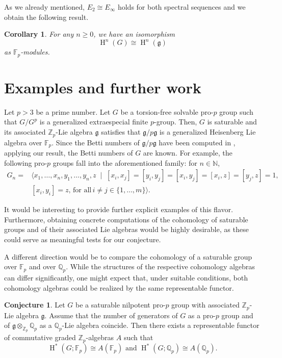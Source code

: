 \documentclass[11pt]{article}
\newcommand{\N}{\mathbb{N}}
\newcommand{\Z}{\mathbb{Z}}
\newcommand{\Q}{\mathbb{Q}}
\newcommand{\F}{\mathbb{F}}
\newcommand{\Fp}{\mathbb{F}_p}
\newcommand{\Zp}{\mathbb{Z}_p}
\newcommand{\Qp}{\mathbb{Q}_p}
\newcommand{\g}{\mathfrak{g}}
\DeclareMathOperator{\HH}{H}
\newcommand{\isom}{\cong}
\theoremstyle{plain}
\newtheorem{corollary}[lemma]{Corollary}
\theoremstyle{definition}
\newtheorem*{Conjecture}{Conjecture}
\begin{document}
	
	
	As we already mentioned, $E_2\cong E_{\infty}$ holds for both spectral sequences and we obtain the following result.
	
	\begin{corollary}
		For any $n\geq 0$, we have an isomorphism
		\begin{displaymath}
			\HH^n(G)\isom \HH^n(\g)
		\end{displaymath}
		as $\Fp$-modules.
	\end{corollary}



\section{Examples and further work}


Let $p>3$ be a prime number. Let $G$ be a torsion-free solvable pro-$p$ group such that $G/G^p$ is a generalized extraespecial finite $p$-group. Then, $G$ is saturable and its associated $\Z_p$-Lie algebra $\g$ satisfies that $\g/p\g$ is a generalized Heisenberg Lie algebra over $\F_p$. Since the Betti numbers of $\g/p\g$ have been computed in \cite{CaJa08}, applying our result, the Betti numbers of $G$ are known. For example, the following pro-$p$ groups fall into the aforementioned family: for $n\in \N$,
\begin{align*}
G_n=&\langle x_1, \dots, x_n, y_1, \dots, y_n, z \; \mid \; [x_i, x_j]=[y_i, y_j]=[x_i, y_j]=[x_i, z]= [y_j,z]= 1,\\
& [x_i,y_i]=z, \, \text{for all}\, i\neq j\in \{1, \dots,m\}\rangle.
\end{align*}


It would be interesting to provide further explicit examples of this flavor. Furthermore, obtaining concrete computations of the cohomology of saturable groups and of their associated Lie algebras would be highly desirable, as these could serve as meaningful tests for our conjecture.

A different direction would be to compare the cohomology of a saturable group over  $\F_p$ and over $\Q_p$. While the structures of the respective cohomology algebras can differ significantly, one might expect that, under suitable conditions, both cohomology algebras could be realized by the same representable functor.


\begin{Conjecture}
	Let $G$ be a saturable nilpotent pro-$p$ group with associated $\Zp$-Lie algebra $\g$.  Assume that the number of generators of $G$ as a pro-$p$ group 
	and of $\g\otimes_{\Z_p} \Q_p$ as a $\Q_p$-Lie algebra coincide. Then there exists a representable functor of commutative graded $\Z_p$-algebras $A$ such that
	\begin{displaymath}
		\HH^{*}(G;\Fp)\cong A(\F_p) \text{\  and\ } \HH^{*}(G;\Qp)\cong A(\Q_p) .
	\end{displaymath}
\end{Conjecture}
\end{document}
